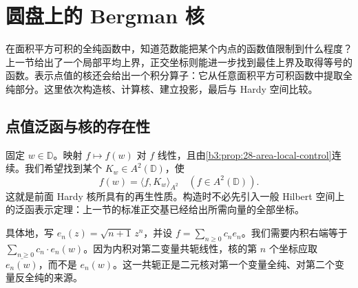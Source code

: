 \section{圆盘上的 Bergman 核}
\label{b3:sec:2805}
在面积平方可积的全纯函数中，知道范数能把某个内点的函数值限制到什么程度？上一节给出了一个局部平均上界，正交坐标则能进一步找到最佳上界及取得等号的函数。表示点值的核还会给出一个积分算子：它从任意面积平方可积函数中提取全纯部分。这里依次构造核、计算核、建立投影，最后与 Hardy 空间比较。

\subsection{点值泛函与核的存在性}
\label{b3:subsec:280501}

固定 \(w\in\mathbb D\)。映射 \(f\mapsto f(w)\) 对 \(f\) 线性，且由\cref{b3:prop:28-area-local-control}连续。我们希望找到某个 \(K_w\in A^2(\mathbb D)\)，使
\[
 f(w)=\langle f,K_w\rangle_{A^2}
 \quad(f\in A^2(\mathbb D)).
\]
这就是前面 Hardy 核所具有的再生性质。构造时不必先引入一般 Hilbert 空间上的泛函表示定理：上一节的标准正交基已经给出所需向量的全部坐标。

\ProseParagraphBreak

具体地，写 \(e_n(z)=\sqrt{n+1}\,z^n\)，并设 \(f=\sum_{n\ge0}c_ne_n\)。我们需要内积右端等于 \(\sum_{n\ge0}c_n\cdot e_n(w)\)。因为内积对第二变量共轭线性，核的第 \(n\) 个坐标应取 \(\overline{e_n(w)}\)，而不是 \(e_n(w)\)。这一共轭正是二元核对第一个变量全纯、对第二个变量反全纯的来源。

